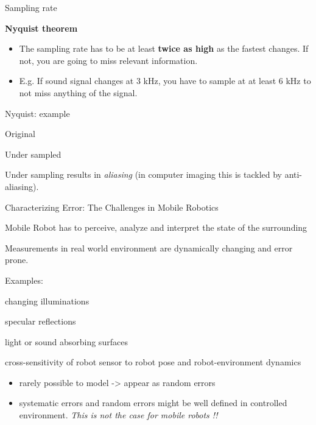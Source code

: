 \documentclass[compress]{beamer}
\providecommand{\tightlist}{%
  \setlength{\itemsep}{0pt}\setlength{\parskip}{0pt}}
\begin{document}
\begin{frame}{Sampling rate}

\textbf{Nyquist theorem}

\begin{itemize}
\tightlist
\item
  The sampling rate has to be at least \textbf{twice as high} as the
  fastest changes. If not, you are going to miss relevant information.
\item
  E.g. If sound signal changes at 3 kHz, you have to sample at at least
  6 kHz to not miss anything of the signal.
\end{itemize}

\end{frame}

\begin{frame}{Nyquist: example}

Original

Under sampled

Under sampling results in \emph{aliasing} (in computer imaging this is
tackled by anti-aliasing).

\end{frame}

\begin{frame}{Characterizing Error: The Challenges in Mobile Robotics}

Mobile Robot has to perceive, analyze and interpret the state of the
surrounding

Measurements in real world environment are dynamically changing and
error prone.

Examples:

changing illuminations

specular reflections

light or sound absorbing surfaces

cross-sensitivity of robot sensor to robot pose and robot-environment
dynamics

\begin{itemize}
\tightlist
\item
  rarely possible to model -\textgreater{} appear as random errors
\item
  systematic errors and random errors might be well defined in
  controlled environment. \emph{This is not the case for mobile robots
  !!}
\end{itemize}

\end{frame}
\end{document}
